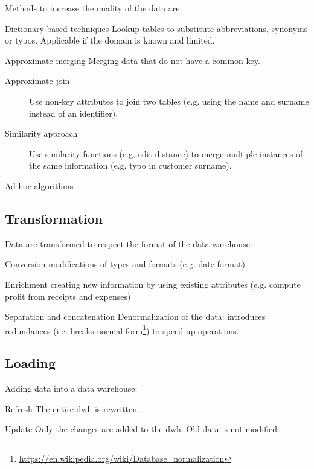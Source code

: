 Methods to increase the quality of the data are:
\begin{descriptionlist}
    \item[Dictionary-based techniques] 
        Lookup tables to substitute abbreviations, synonyms or typos.
        Applicable if the domain is known and limited.
        
    \item[Approximate merging] 
        Merging data that do not have a common key.
        \begin{description}
            \item[Approximate join]
                Use non-key attributes to join two tables (e.g. using the name and surname instead of an identifier).

            \item[Similarity approach]
                Use similarity functions (e.g. edit distance) to merge multiple instances of the same information
                (e.g. typo in customer surname).
        \end{description}
    
    \item[Ad-hoc algorithms] 
\end{descriptionlist}


\subsection{Transformation}
Data are transformed to respect the format of the data warehouse:
\begin{descriptionlist}
    \item[Conversion] 
        modifications of types and formats (e.g. date format)
    
    \item[Enrichment] 
        creating new information by using existing attributes (e.g. compute profit from receipts and expenses)

    \item[Separation and concatenation] 
        Denormalization of the data: introduces redundances (i.e. breaks normal form\footnote{\url{https://en.wikipedia.org/wiki/Database_normalization}}) 
        to speed up operations.
\end{descriptionlist}


\subsection{Loading}
Adding data into a data warehouse:
\begin{descriptionlist}
    \item[Refresh] 
        The entire \ac{dwh} is rewritten.

    \item[Update] 
        Only the changes are added to the \ac{dwh}. Old data is not modified.
\end{descriptionlist}


